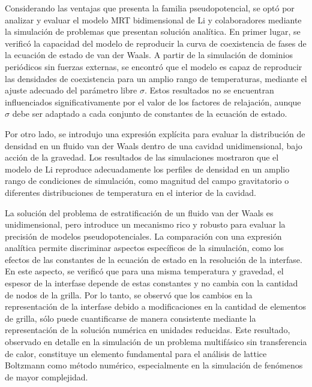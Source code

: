 Considerando las ventajas que presenta la familia pseudopotencial, se opt\'o por analizar y evaluar el modelo MRT bidimensional de Li y colaboradores mediante la simulaci\'on de problemas que presentan soluci\'on anal\'itica. En primer lugar, se verific\'o la capacidad del modelo de reproducir la curva de coexistencia de fases de la ecuaci\'on de estado de van der Waals. A partir de la simulaci\'on de dominios peri\'odicos sin fuerzas externas, se encontr\'o que el modelo es capaz de reproducir las densidades de coexistencia para un amplio rango de temperaturas, mediante el ajuste adecuado del par\'ametro libre $\sigma$. Estos resultados no se encuentran influenciados significativamente por el valor de los factores de relajaci\'on, aunque $\sigma$ debe ser adaptado a cada conjunto de constantes de la ecuaci\'on de estado.

Por otro lado, se introdujo una expresi\'on expl\'icita para evaluar la distribuci\'on de densidad en un fluido van der Waals dentro de una cavidad unidimensional, bajo acci\'on de la gravedad. Los resultados de las simulaciones mostraron que el modelo de Li reproduce adecuadamente los perfiles de densidad en un amplio rango de condiciones de simulaci\'on, como magnitud del campo gravitatorio o diferentes distribuciones de temperatura en el interior de la cavidad.

La soluci\'on del problema de estratificaci\'on de un fluido van der Waals es unidimensional, pero introduce un mecanismo rico y robusto para evaluar la precisi\'on de modelos pseudopotenciales. La comparaci\'on con una expresi\'on anal\'itica permite discriminar aspectos espec\'ificos de la simulaci\'on, como los efectos de las constantes de la ecuaci\'on de estado en la resoluci\'on de la interfase. En este aspecto, se verific\'o que para una misma temperatura y gravedad, el espesor de la interfase depende de estas constantes y no cambia con la cantidad de nodos de la grilla. Por lo tanto, se observ\'o que los cambios en la representaci\'on de la interfase debido a modificaciones en la cantidad de elementos de grilla, s\'olo puede cuantificarse de manera consistente mediante la representaci\'on de la soluci\'on num\'erica en unidades reducidas. Este resultado, observado en detalle en la simulaci\'on de un problema multif\'asico sin transferencia de calor, constituye un elemento fundamental para el an\'alisis de lattice Boltzmann como m\'etodo num\'erico, especialmente en la simulaci\'on de fen\'omenos de mayor complejidad.
